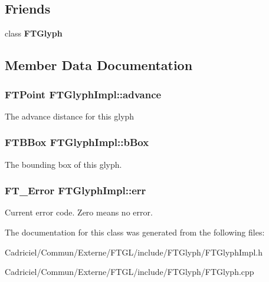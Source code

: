 \subsection*{Friends}
\begin{DoxyCompactItemize}
\item 
class {\bfseries F\+T\+Glyph}\hypertarget{class_f_t_glyph_impl_a908ad68576153727d761f276dd8fd0e2}{}\label{class_f_t_glyph_impl_a908ad68576153727d761f276dd8fd0e2}

\end{DoxyCompactItemize}


\subsection{Member Data Documentation}
\subsubsection[{\texorpdfstring{advance}{advance}}]{\setlength{\rightskip}{0pt plus 5cm}F\+T\+Point F\+T\+Glyph\+Impl\+::advance\hspace{0.3cm}{\ttfamily [protected]}}\hypertarget{class_f_t_glyph_impl_acd0a260e13ec1714c2556d24a5352a31}{}\label{class_f_t_glyph_impl_acd0a260e13ec1714c2556d24a5352a31}
The advance distance for this glyph 
\subsubsection[{\texorpdfstring{b\+Box}{bBox}}]{\setlength{\rightskip}{0pt plus 5cm}F\+T\+B\+Box F\+T\+Glyph\+Impl\+::b\+Box\hspace{0.3cm}{\ttfamily [protected]}}\hypertarget{class_f_t_glyph_impl_a871a6a1a24be465bfae17b7a8e464b3c}{}\label{class_f_t_glyph_impl_a871a6a1a24be465bfae17b7a8e464b3c}
The bounding box of this glyph. 
\subsubsection[{\texorpdfstring{err}{err}}]{\setlength{\rightskip}{0pt plus 5cm}F\+T\+\_\+\+Error F\+T\+Glyph\+Impl\+::err\hspace{0.3cm}{\ttfamily [protected]}}\hypertarget{class_f_t_glyph_impl_a7a489998b09aef9ceb733604166e933c}{}\label{class_f_t_glyph_impl_a7a489998b09aef9ceb733604166e933c}
Current error code. Zero means no error. 

The documentation for this class was generated from the following files\+:\begin{DoxyCompactItemize}
\item 
Cadriciel/\+Commun/\+Externe/\+F\+T\+G\+L/include/\+F\+T\+Glyph/F\+T\+Glyph\+Impl.\+h\item 
Cadriciel/\+Commun/\+Externe/\+F\+T\+G\+L/include/\+F\+T\+Glyph/F\+T\+Glyph.\+cpp\end{DoxyCompactItemize}
